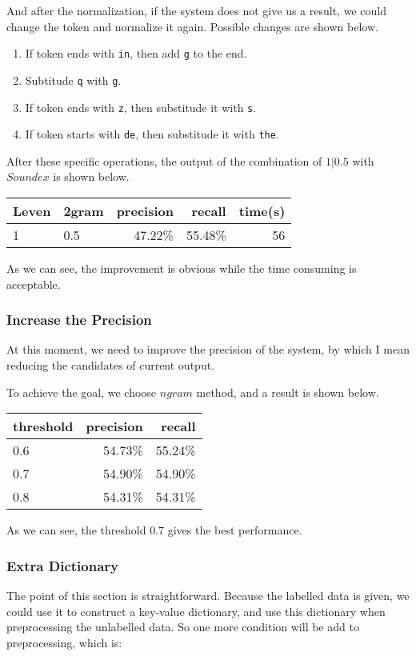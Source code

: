 \documentclass[11pt]{article}
\begin{document}
And after the normalization, if the system does not give us a result,
we could change the token and normalize it again.
Possible changes are shown below.
\begin{enumerate}
  \item
  If token ends with \texttt{in}, then add \texttt{g} to the end.
  \item
  Subtitude \texttt{q} with \texttt{g}.
  \item
  If token ends with \texttt{z}, then substitude it with \texttt{s}.
  \item
  If token starts with \texttt{de}, then substitude it with \texttt{the}.
\end{enumerate}

After these specific operations,
the output of the combination of $1|0.5$ with $Soundex$ is shown below.
\begin{center}
    \begin{tabular}{|l|l|r|r|r|}
      \hline
      Leven & 2gram & precision & recall & time(s)\\
      \hline
      1 & 0.5 & 47.22\% & 55.48\% & 56\\
      \hline
    \end{tabular}
\end{center}

As we can see, the improvement is obvious while the time consuming is acceptable.
\subsubsection{Increase the Precision}
At this moment, we need to improve the precision of the system,
by which I mean reducing the candidates of current output.

To achieve the goal, we choose $ngram$ method, and a result is shown below.
\begin{center}
    \begin{tabular}{|l|r|r|}
      \hline
      threshold & precision & recall\\
      \hline
      0.6 & 54.73\% & 55.24\%\\
      \hline
      0.7 & 54.90\% & 54.90\%\\
      \hline
      0.8 & 54.31\% & 54.31\%\\
      \hline
    \end{tabular}
\end{center}
As we can see, the threshold $0.7$ gives the best performance.

\subsubsection{Extra Dictionary}
The point of this section is straightforward.
Because the labelled data is given,
we could use it to construct a key-value dictionary,
and use this dictionary when preprocessing the unlabelled data.
So one more condition will be add to preprocessing, which is:
\end{document}
